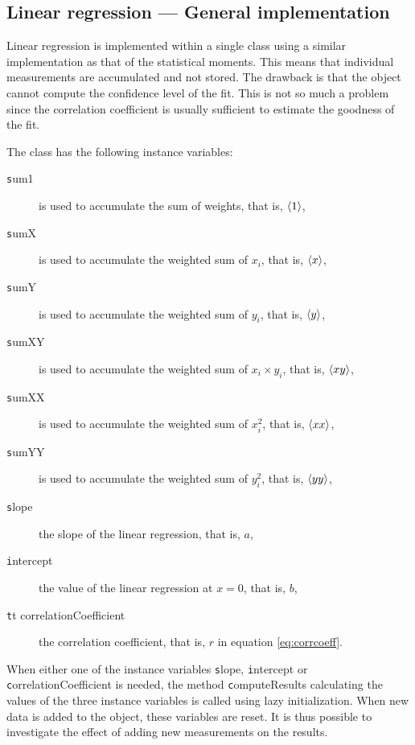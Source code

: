 \subsection{Linear regression --- General  implementation}
 Linear regression is implemented within
a single class using a similar implementation as that of the
statistical moments.
This means that individual measurements are
accumulated and not stored.
The drawback is that the object cannot
compute the confidence level of the fit.
This is not so much a
problem since the correlation coefficient is usually sufficient to
estimate the goodness of the fit.

\noindent The class has the following instance variables:
\begin{description}
  \item[\texttt sum1] is used to accumulate the sum of weights, that
  is, $\left\langle 1\right\rangle$,
  \item[\texttt sumX] is used to accumulate the weighted sum of $x_i$, that
  is, $\left\langle x\right\rangle$,
  \item[\texttt sumY] is used to accumulate the weighted sum of $y_i$, that
  is, $\left\langle y\right\rangle$,
  \item[\texttt sumXY] is used to accumulate the weighted sum of $x_i\times y_i$, that
  is, $\left\langle xy\right\rangle$,
  \item[\texttt sumXX] is used to accumulate the weighted sum of $x_i^2$, that
  is, $\left\langle xx\right\rangle$,
  \item[\texttt sumYY] is used to accumulate the weighted sum of $y_i^2$, that
  is, $\left\langle yy\right\rangle$,
  \item[\texttt slope] the slope of the linear regression, that is,
  $a$,
  \item[\texttt intercept] the value of the linear regression at $x=0$, that is,
  $b$,
  \item[\texttt tt correlationCoefficient] the correlation coefficient, that is,
  $r$ in equation \ref{eq:corrcoeff}.
\end{description}
When either one of the instance variables {\texttt slope}, {\texttt
intercept} or {\texttt correlationCoefficient} is needed, the method
{\texttt computeResults} calculating the values of the three instance
variables is called using lazy initialization.
When new data is added to the object, these variables are reset.
It is thus
possible to investigate the effect of adding new measurements on
the results.

